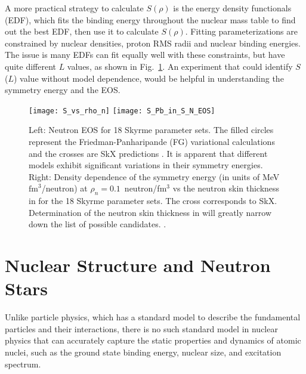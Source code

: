 A more practical strategy to calculate $S(\rho)$ is the energy density functionals (EDF), 
which fits the binding energy throughout the nuclear mass table to find out the best EDF,
then use it to calculate $S(\rho)$. Fitting parameterizations are constrained
by nuclear densities, proton RMS radii and nuclear binding energies. 
The issue is many EDFs can fit equally well with these constraints, but have quite 
different $L$ values, as shown in Fig.~\ref{fig:neutron_EOS}.
An experiment that could identify $S$ ($L$) value without model dependence, 
would be helpful in understanding the symmetry energy and the EOS.
\begin{figure}[!h]
    \texttt{[image: S\_vs\_rho\_n]}
    \hfill
    \texttt{[image: S\_Pb\_in\_S\_N\_EOS]}
    \caption[Neutron EOS with different slope values]
    {Left: Neutron EOS for 18 Skyrme \cite{Skyrme} parameter sets. The filled circles represent
    the Friedman-Panharipande (FG) variational calculations and the crosses are SkX predictions
    \cite{PhysRevC.58.220}.
    It is apparent that different models exhibit significant variations in their symmetry energies.
    Right: Density dependence of the symmetry energy (in units of MeV $\mathrm{fm}^3$/neutron) 
    at $\rho_n = 0.1$~neutron/fm${}^3$ vs the neutron skin thickness in \Pb 
    for the 18 Skyrme parameter sets. The cross corresponds to SkX. 
    Determination of the neutron skin thickness in \Pb will greatly narrow down
    the list of possible candidates.
    \cite{PRL.85.5296}.
    }
    \label{fig:neutron_EOS}
\end{figure}

  
\section{Nuclear Structure and Neutron Stars}
Unlike particle physics, which has a standard model to describe the fundamental particles and their interactions, there is no such standard model in nuclear physics that can accurately capture the static properties and dynamics of atomic nuclei, such as the ground state binding energy, nuclear size, and excitation spectrum.

